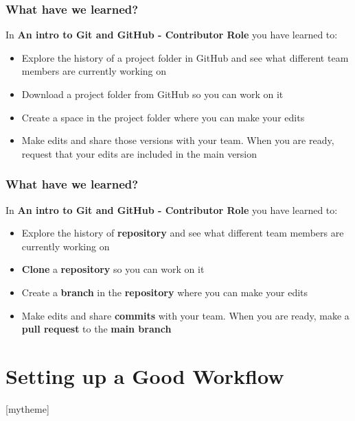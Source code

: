 \documentclass[aspectratio=169]{beamer}
\newcommand{\sectionpic}[2]{
	\section{#1}
	\setbeamertemplate{section page}[mytheme]
}
\begin{document}
\begin{frame}
\frametitle{What have we learned?}

	In \textbf{An intro to Git and GitHub - Contributor Role} you have learned to:

	\begin{itemize}
		\item Explore the history of a project folder in GitHub and see what different team members are currently working on
		\item Download a project folder from GitHub so you can work on it
		\item Create a space in the project folder where you can make your edits
		\item Make edits and share those versions with your team. When you are ready, request that your edits are included in the main version
	\end{itemize}

\end{frame}

\begin{frame}
\frametitle{What have we learned?}

	In \textbf{An intro to Git and GitHub - Contributor Role} you have learned to:

	\begin{itemize}
		\item Explore the history of \textbf{repository} and see what different team members are currently working on
		\item \textbf{Clone} a \textbf{repository} so you can work on it
		\item Create a \textbf{branch} in the \textbf{repository} where you can make your edits
		\item Make edits and share \textbf{commits} with your team. When you are ready, make a \textbf{pull request} to the \textbf{main branch}
	\end{itemize}
\end{frame}

\sectionpic{Setting up a Good Workflow}{}
\end{document}

